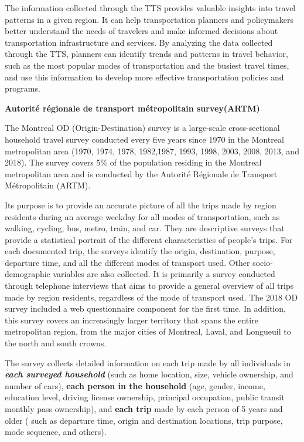 \documentclass[
11pt, %
oneside, %
english, %
singlespacing, %
]{macthesis} %
\begin{document}
The information collected through the TTS provides valuable insights into travel patterns in a given region. It can help transportation planners and policymakers better understand the needs of travelers and make informed decisions about transportation infrastructure and services. By analyzing the data collected through the TTS, planners can identify trends and patterns in travel behavior, such as the most popular modes of transportation and the busiest travel times, and use this information to develop more effective transportation policies and programs.

\textbf{Autorité régionale de transport métropolitain survey(ARTM)}

The Montreal OD (Origin-Destination) survey is a large-scale cross-sectional household travel survey conducted every five years since 1970 in the Montreal metropolitan area (1970, 1974, 1978, 1982,1987, 1993, 1998, 2003, 2008, 2013, and 2018). The survey covers 5\% of the population residing in the Montreal metropolitan area and is conducted by the Autorité Régionale de Transport Métropolitain (ARTM).

Its purpose is to provide an accurate picture of all the trips made by region residents during an average weekday for all modes of transportation, such as walking, cycling, bus, metro, train, and car. They are descriptive surveys that provide a statistical portrait of the different characteristics of people's trips. For each documented trip, the surveys identify the origin, destination, purpose, departure time, and all the different modes of transport used. Other socio-demographic variables are also collected. It is primarily a survey conducted through telephone interviews that aims to provide a general overview of all trips made by region residents, regardless of the mode of transport used. The 2018 OD survey included a web questionnaire component for the first time. In addition, this survey covers an increasingly larger territory that spans the entire metropolitan region, from the major cities of Montreal, Laval, and Longueuil to the north and south crowns.

The survey collects detailed information on each trip made by all individuals in \textbf{\emph{each surveyed household}} (such as home location, size, vehicle ownership, and number of cars), \textbf{each person in the household} (age, gender, income, education level, driving license ownership, principal occupation, public transit monthly pass ownership), and \textbf{each trip} made by each person of 5 years and older ( such as departure time, origin and destination locations, trip purpose, mode sequence, and others).
\end{document}
